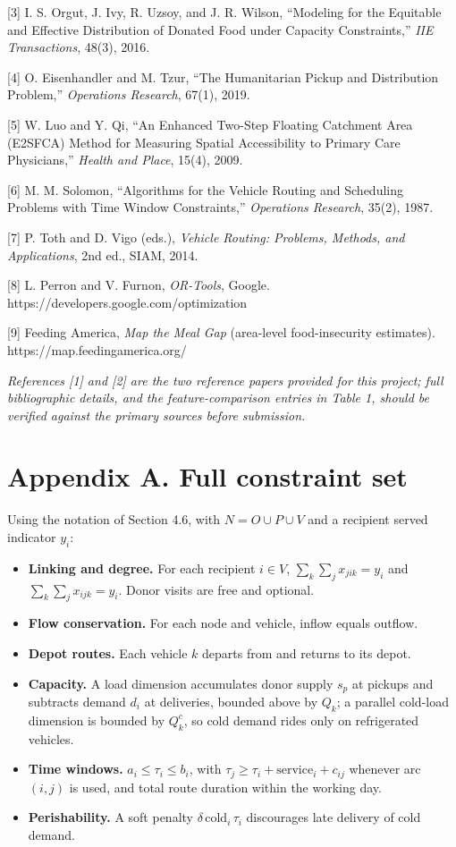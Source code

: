 \documentclass[
  11pt,
]{article}
\providecommand{\tightlist}{%
  \setlength{\itemsep}{0pt}\setlength{\parskip}{0pt}}
\begin{document}
{[}3{]} I. S. Orgut, J. Ivy, R. Uzsoy, and J. R. Wilson, ``Modeling for
the Equitable and Effective Distribution of Donated Food under Capacity
Constraints,'' \emph{IIE Transactions}, 48(3), 2016.

{[}4{]} O. Eisenhandler and M. Tzur, ``The Humanitarian Pickup and
Distribution Problem,'' \emph{Operations Research}, 67(1), 2019.

{[}5{]} W. Luo and Y. Qi, ``An Enhanced Two-Step Floating Catchment Area
(E2SFCA) Method for Measuring Spatial Accessibility to Primary Care
Physicians,'' \emph{Health and Place}, 15(4), 2009.

{[}6{]} M. M. Solomon, ``Algorithms for the Vehicle Routing and
Scheduling Problems with Time Window Constraints,'' \emph{Operations
Research}, 35(2), 1987.

{[}7{]} P. Toth and D. Vigo (eds.), \emph{Vehicle Routing: Problems,
Methods, and Applications}, 2nd ed., SIAM, 2014.

{[}8{]} L. Perron and V. Furnon, \emph{OR-Tools}, Google.
https://developers.google.com/optimization

{[}9{]} Feeding America, \emph{Map the Meal Gap} (area-level
food-insecurity estimates). https://map.feedingamerica.org/

\emph{References {[}1{]} and {[}2{]} are the two reference papers
provided for this project; full bibliographic details, and the
feature-comparison entries in Table 1, should be verified against the
primary sources before submission.}

\section{Appendix A. Full constraint
set}\label{appendix-a.-full-constraint-set}

Using the notation of Section 4.6, with \(N = O \cup P \cup V\) and a
recipient served indicator \(y_i\):

\begin{itemize}
\tightlist
\item
  \textbf{Linking and degree.} For each recipient \(i \in V\),
  \(\sum_{k}\sum_{j} x_{jik} = y_i\) and
  \(\sum_{k}\sum_{j} x_{ijk} = y_i\). Donor visits are free and
  optional.
\item
  \textbf{Flow conservation.} For each node and vehicle, inflow equals
  outflow.
\item
  \textbf{Depot routes.} Each vehicle \(k\) departs from and returns to
  its depot.
\item
  \textbf{Capacity.} A load dimension accumulates donor supply \(s_p\)
  at pickups and subtracts demand \(d_i\) at deliveries, bounded above
  by \(Q_k\); a parallel cold-load dimension is bounded by \(Q^{c}_k\),
  so cold demand rides only on refrigerated vehicles.
\item
  \textbf{Time windows.} \(a_i \le \tau_i \le b_i\), with
  \(\tau_j \ge \tau_i + \text{service}_i + c_{ij}\) whenever arc
  \((i,j)\) is used, and total route duration within the working day.
\item
  \textbf{Perishability.} A soft penalty
  \(\delta\,\text{cold}_i\,\tau_i\) discourages late delivery of cold
  demand.
\end{itemize}
\end{document}
